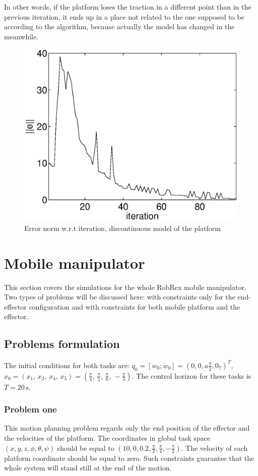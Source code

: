 In other words, if the platform loses the traction in a different point than in
the previous iteration, it ends up in a place not related to the one supposed to be
according to the algorithm, because actually the model has changed in the meanwhile.
\begin{figure}[htp]
\centering
\includegraphics[height=0.3\textheight]{img/discont_err.eps}
\caption{Error norm w.r.t iteration, discontinuous model of the platform}
\label{fig:error_discont}
\end{figure}

\section{Mobile manipulator}
This section covers the simulations for the whole RobRex mobile manipulator. Two types of problems will
be discussed here: with constraints only for the end-effector configuration and with constraints for
both mobile platform and the effector.
\subsection{Problems formulation}
The initial conditions for both tasks are: $q_0 = [w_0; \dot{w}_0] = (0, 0, a\frac{\pi}{2}, 0_7)^T$, 
$x_0 = \left(
x_1 ,\, x_2 ,\, x_4 ,\, x_5
\right) = \left(
\frac{\pi}{4} ,\, \frac{\pi}{5} ,\, \frac{\pi}{6} ,\, -\frac{\pi}{3}
\right).$ The control horizon for these tasks is $T=20\,\mathrm{s}$.
\subsubsection{Problem one}
This motion planning problem regards only the end position of the effector
and the velocities of the platform. 
The coordinates in global task space $(x, y, z, \phi, \theta, \psi) $ should be equal to
$(10, 0, 0.2, \frac{\pi}{2}, \frac{\pi}{4}, -\frac{\pi}{2})$. The velocity of each platform coordinate
should be equal to zero. Such constraints guarantee that the whole system will stand still at the end
of the motion.
